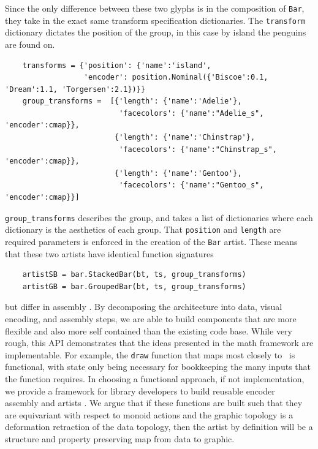 \documentclass[../main.tex]{subfiles}
\begin{document}
Since the only difference between these two glyphs is in the composition of \texttt{Bar}, they take in the exact same transform specification dictionaries. The \texttt{transform} dictionary dictates the position of the group, in this case by island the penguins are found on.

\begin{verbatim}
    transforms = {'position': {'name':'island',
                  'encoder': position.Nominal({'Biscoe':0.1, 'Dream':1.1, 'Torgersen':2.1})}} 
    group_transforms =  [{'length': {'name':'Adelie'},
                          'facecolors': {'name':"Adelie_s", 'encoder':cmap}},
                         {'length': {'name':'Chinstrap'},
                          'facecolors': {'name':"Chinstrap_s", 'encoder':cmap}}, 
                         {'length': {'name':'Gentoo'},
                          'facecolors': {'name':"Gentoo_s", 'encoder':cmap}}]
    \end{verbatim}
    \texttt{group_transforms} describes the group, and takes a list of dictionaries where each dictionary is the aesthetics of each group. That \texttt{position} and \texttt{length} are required parameters is enforced in the creation of the \texttt{Bar} artist. These means that these two artists have identical function signatures
    
    \begin{verbatim}
    artistSB = bar.StackedBar(bt, ts, group_transforms)
    artistGB = bar.GroupedBar(bt, ts, group_transforms)
    \end{verbatim}
    
    but differ in assembly \vmarkd. By decomposing the architecture into data, visual encoding, and assembly steps, we are able to build components that are more flexible and also more self contained than the existing code base. While very rough, this API demonstrates that the ideas presented in the math framework are implementable. For example, the \texttt{draw} function that maps most closely to \vartist\ is functional, with state only being necessary for bookkeeping the many inputs that the function requires. In choosing a functional approach, if not implementation, we provide a framework for library developers to build reusable encoder \vchannel\, assembly \vmarkd and artists \vartist. We argue that  if these functions are built such that they are equivariant with respect to monoid actions and the graphic topology is a deformation retraction of the data topology, then the artist by definition will be a structure and property preserving map from data to graphic. 
\end{document}
